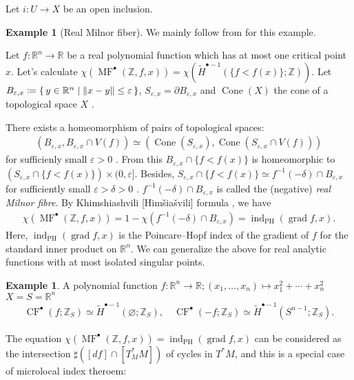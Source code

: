 \documentclass[a4paper,dvipdfmx,reqno,12pt]{amsart}
\theoremstyle{definition}
\newtheorem{Eg}[Thm]{Example}
\newcommand{\deq}{\coloneqq}
\newcommand{\emp}{\varnothing}%
\newcommand{\R}{\mathbb{R}}%
\newcommand{\Z}{\mathbb{Z}}%
\newcommand{\vep}{\varepsilon}%
\newcommand{\opn}[1]{\operatorname{#1}}
\numberwithin{equation}{section}
\begin{document}
Let $i\colon U\to X$ be an open inclusion.

\begin{Eg}[{Real Milnor fiber}] \label{eg:}
We mainly follow from \cite[3.2]{MR3779558} for this example.

Let $f\colon \R^{n}\to \R$ be a real polynomial function
which has at most one critical point $x$.
Let's calculate 
$\chi (\opn{MF}^{\bullet}(\Z,f,x))
=\chi(\tilde{H}^{\bullet-1}(\{f<f(x)\};\Z))$.
Let $B_{\vep,x}\deq \set{y\in \R^{n}\mid \|x-y\|\leq \vep}$,
$S_{\vep,x}=\partial B_{\vep,x}$ and 
$\opn{Cone}(X)$ the cone of a topological space $X$
\cite[Example 4.4]{hatcherAlgebraicTopology2002a}.

There exists a homeomorphism of pairs of
topological spaces:
\begin{align}
(B_{\vep,x},B_{\vep,x}\cap V(f))\simeq 
(\opn{Cone}(S_{\vep,x}),\opn{Cone}(S_{\vep,x}\cap V(f)))
\end{align}
for sufficienly small $\vep>0$
\cite[Theorem 2.10]{MR0239612}.
From this $B_{\vep,x}\cap\{f<f(x)\}$ is homeomorphic to
$(S_{\vep,x}\cap \{f<f(x)\})\times (0,\vep]$.
Besides, $S_{\vep,x}\cap \{f<f(x)\}\simeq 
f^{-1}(-\delta)\cap B_{\vep,x}$
for sufficiently small $\vep>\delta>0$ 
\cite[Lemma 5.10]{MR0239612}.
$f^{-1}(-\delta)\cap B_{\vep,x}$ is called 
the (negative) \emph{real Milnor fibre}.
By Khimshiashvili [Himšiašvili] formula \cite{MR0458467}, we have
\begin{align} \label{eq: Khim}
  \chi(\opn{MF}^{\bullet}(\Z,f,x))
=1-\chi(f^{-1}(-\delta)\cap B_{\vep,x})
=\opn{ind}_{\opn{PH}}(\opn{grad} f,x).
\end{align}
Here, $\opn{ind}_{\opn{PH}}(\opn{grad} f,x)$ is the 
Poincare--Hopf index of the gradient of $f$ for the standard 
inner product on $\R^{n}$.
We can generalize the above for real analytic functions with 
at most isolated singular points.
\end{Eg}

\begin{Eg}
  A polynomial function $f\colon \R^{n}\to \R;(x_1,\ldots,x_n)\mapsto x_1^{2}+\cdots+x_n^{2}$
  $X=S=\R^{n}$
  \begin{align}
    \opn{CF}^{\bullet}(f;\Z_S)\simeq \tilde{H}^{\bullet-1}(\emp;\Z_S),
    \quad \opn{CF}^{\bullet}(-f;\Z_S) \simeq \tilde{H}^{\bullet-1}(S^{n-1};\Z_S).
  \end{align}
\end{Eg}
The equation $\chi(\opn{MF}^{\bullet}(\Z,f,x))=
\opn{ind}_{\opn{PH}}(\opn{grad} f,x)$ can be considered 
as the intersection $\sharp ([df]\cap [T^{*}_M M])$ of cycles in $T^{*}M$,
and this is a special case of
microlocal index theroem:
\end{document}

